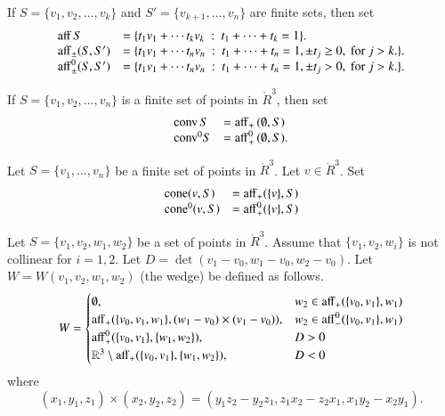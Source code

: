 \begin{definition}
If $S = \{v_1,v_2,\ldots,v_k\}$ 
and $S'=\{v_{k+1},\ldots,v_n\}$ are  finite sets, then
set
	$$\begin{array}{lll}
      {\operatorname{aff}}\, S &= \{t_1 v_1 +\cdots t_k v_k \ :\ 
	t_1 +\cdots+t_k = 1\}.\\
        {\operatorname{aff}}_{\pm} (S,S') &= \{t_1 v_1 +\cdots t_n v_n \ :\ 
	t_1 +\cdots+t_n = 1, \pm t_j \ge 0, \text{ for } j>k.\}.\\
        {\operatorname{aff}}^0_{\pm} (S,S') &= \{t_1 v_1 +\cdots t_n v_n \ :\ 
	t_1 +\cdots+t_n = 1, \pm t_j > 0, \text{ for } j>k.\}.\\
		\end{array}
        $$
\end{definition}

\begin{definition}
If $S = \{v_1,v_2,\ldots,v_n\}$ is a finite set
of points in $\ring{R}^3$, then
set
	$$
        \begin{array}{lll}
          {\operatorname{conv}}\, S &= {\operatorname{aff}}_+\, (\emptyset,S)\\
	   {\operatorname{conv}}^0 S &= {\operatorname{aff}}^0_+\, (\emptyset,S).\\
           \end{array}
        $$
\end{definition}


\begin{definition}[cone]
Let $S=\{v_1,\ldots,v_n\}$ be a finite set of points in 
$\ring{R}^3$.  Let $v\in\ring{R}^3$. Set
  $$\begin{array}{lll}
  {\operatorname{cone}}(v,S) &= {\operatorname{aff}}_+(\{v\},S)\\
  {\operatorname{cone}}^0(v,S) &= {\operatorname{aff}}^0_+(\{v\},S)\\
  \end{array}
  $$
\end{definition}

\begin{definition}[wedge,~W]
Let $S=\{v_1,v_2,w_1,w_2\}$ be a set of points in
$\ring{R}^3$.  Assume that $\{v_1,v_2,w_i\}$ is not collinear
for $i=1,2$. Let $D = \det(v_1-v_0,w_1-v_0,w_2-v_0)$.  
Let $W = W(v_1,v_2,w_1,w_2)$ (the wedge) be defined
as follows.  
$$
W=\begin{cases}
\emptyset,& w_2\in {\operatorname{aff}}_+(\{v_0,v_1\},w_1)\\
{\operatorname{aff}}_+(\{v_0,v_1,w_1\},(w_1-v_0)\times (v_1-v_0)),&
    w_2\in{\operatorname{aff}}_-^0(\{v_0,v_1\},w_1)\\
{\operatorname{aff}}_+^0(\{v_0,v_1\},\{w_1,w_2\}),& D > 0\\
\mathbb{R}^3\setminus{\operatorname{aff}}_+(\{v_0,v_1\},\{w_1,w_2\}),& D < 0\\
\end{cases}
$$
where 
$$
(x_1,y_1,z_1)\times (x_2,y_2,z_2) = 
(y_1 z_2 - y_2 z_1, z_1 x_2 - z_2 x_1, x_1 y_2 - x_2 y_1).
$$
\end{definition}

